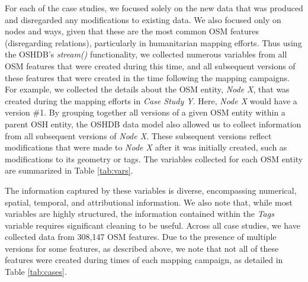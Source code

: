 For each of the case studies, we focused solely on the new data that was produced and disregarded any modifications to existing data. We also focused only on nodes and ways, given that these are the most common OSM features (disregarding relations), particularly in humanitarian mapping efforts. Thus using the OSHDB's \textit{stream()} functionality, we collected numerous variables from all OSM features that were created during this time, and all subsequent versions of these features that were created in the time following the mapping campaigns. For example, we collected the details about the OSM entity, \textit{Node X}, that was created during the mapping efforts in \textit{Case Study Y}. Here, \textit{Node X} would have a version \#1. By grouping together all versions of a given OSM entity within a parent OSH entity, the OSHDB data model also allowed us to collect information from all subsequent versions of \textit{Node X}. These subsequent versions reflect modifications that were made to \textit{Node X} after it was initially created, such as modifications to its geometry or tags. The variables collected for each OSM entity are summarized in Table \ref{tab:vars}. 

The information captured by these variables is diverse, encompassing numerical, spatial, temporal, and attributional information. We also note that, while most variables are highly structured, the information contained within the \textit{Tags} variable requires significant cleaning to be useful. Across all case studies, we have collected data from 308,147 OSM features. Due to the presence of multiple versions for some features, as described above, we note that not all of these features were created during times of each mapping campaign, as detailed in Table \ref{tab:cases}.

